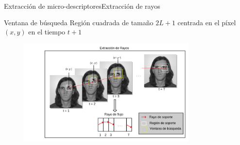 \documentclass{beamer}
\begin{document}
    
    		\begin{frame}{Extracción de micro-descriptores}{Extracción de rayos}
			\begin{block}{Ventana de búsqueda}
                  Región cuadrada de tamaño $2L+1$ centrada en el píxel $(x,y)$ en el tiempo $t+1$
            \end{block}    			
    			
    			\begin{figure}[bt]
        			\centering
                \includegraphics[width=9cm]{imagenes/Extraccion_de_rayos.png}
            \end{figure}        
	            
        \end{frame}
    
\end{document}
